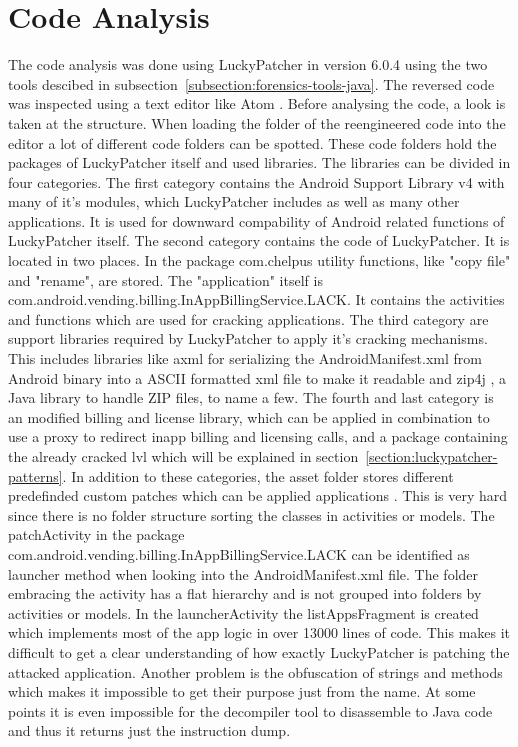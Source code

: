 \section{Code Analysis} \label{section:luckypatcher-analysis}
The code analysis was done using LuckyPatcher in version 6.0.4 using the two tools descibed in subsection~\ref{subsection:forensics-tools-java}.
The reversed code was inspected using a text editor like Atom \cite{atom}.
\newline
Before analysing the code, a look is taken at the structure.
When loading the folder of the reengineered code into the editor a lot of different code folders can be spotted.
These code folders hold the packages of LuckyPatcher itself and used libraries.
The libraries can be divided in four categories.
The first category contains the Android Support Library v4 with many of it's modules, which LuckyPatcher includes as well as many other applications.
It is used for downward compability of Android related functions of LuckyPatcher itself.
The second category contains the code of LuckyPatcher. It is located in two places.
In the package com.chelpus utility functions, like "copy file" and "rename", are stored.
The "application" itself is com.android.vending.billing.InAppBillingService.LACK. It contains the activities and functions which are used for cracking applications.
The third category are support libraries required by LuckyPatcher to apply it's cracking mechanisms.
This includes libraries like axml \cite{axml} for serializing the AndroidManifest.xml from Android binary into a ASCII formatted xml file to make it readable and zip4j \cite{zip4j}, a Java library to handle ZIP files, to name a few.
The fourth and last category is an modified billing and license library, which can be applied in combination to use a proxy to redirect inapp billing and licensing calls, and a package containing the already cracked \gls{lvl} which will be explained in section~\ref{section:luckypatcher-patterns}.
In addition to these categories, the asset folder stores different predefinded custom patches which can be applied applications \cite{munteanLicensing}.
\newline
This is very hard since there is no folder structure sorting the classes in activities or models.
The patchActivity in the package com.android.vending.billing.InAppBillingService.LACK can be identified as launcher method when looking into the AndroidManifest.xml file.
The folder embracing the activity has a flat hierarchy and is not grouped into folders by activities or models.
In the launcherActivity the listAppsFragment is created which implements most of the app logic in over 13000 lines of code.
This makes it difficult to get a clear understanding of how exactly LuckyPatcher is patching the attacked application.
Another problem is the obfuscation of strings and methods which makes it impossible to get their purpose just from the name.
At some points it is even impossible for the decompiler tool to disassemble to Java code and thus it returns just the instruction dump.
